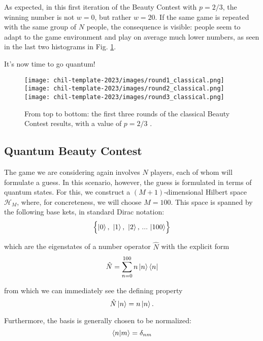 As expected, in this first iteration of the Beauty Contest with $p=2/3$, the winning number is not $w=0$, but rather $w=20$. If the same game is repeated with the same group of $N$ people, the consequence is visible: people seem to adapt to the game environment and play on average much lower numbers, as seen in the last two histograms in Fig. \ref{fig:1}.

It's now time to go quantum!

\begin{figure}[h]
    \centering
    \texttt{[image: chil-template-2023/images/round1\_classical.png]}\vspace{0.5cm}
    \texttt{[image: chil-template-2023/images/round2\_classical.png]}\vspace{0.5cm}
    \texttt{[image: chil-template-2023/images/round3\_classical.png]}
    \caption{From top to bottom: the first three rounds of the classical Beauty Contest results, with a value of $p=2/3$ \citep{diekmann2009classical}.}
    \label{fig:1}
\end{figure}

\subsection{Quantum Beauty Contest}

The game we are considering again involves $N$ players, each of whom will formulate a guess. In this scenario, however, the guess is formulated in terms of quantum states. For this, we construct a $(M+1)$-dimensional Hilbert space $\mathcal{H}_M$, where, for concreteness, we will choose $M=100$. This space is spanned by the following base kets, in standard Dirac notation:
\begin{equation}
  \label{eq:basis}
  \Bigl\{\ket{0},\ \ket{1},\ \ket{2},\,...\,\ket{100}\Bigr\}
\end{equation}

which are the eigenstates of a number operator $\hat{N}$ with the explicit form
\begin{equation}
    \hat{N} = \sum_{n=0}^{100} n \ket{n}\bra{n}
\end{equation}

from which we can immediately see the defining property
\begin{equation}
    \label{eq:number_operator}
    \hat{N}\ket{n} = n \ket{n}.
\end{equation}

Furthermore, the basis is generally chosen to be normalized:
\begin{equation}
    \label{eq:normalization}
    \braket{n|m} = \delta_{nm}
\end{equation}

